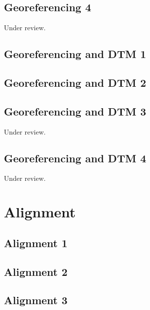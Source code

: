 \documentclass{scrartcl}
\begin{document}
\subsection{Georeferencing 4}
\label{sec:georeferencing_4}
Under review.%
\clearpage

\subsection{Georeferencing and DTM 1}
\label{sec:georef_tin_1}
\clearpage

\subsection{Georeferencing and DTM 2}
\label{sec:georef_tin_2}
\clearpage

\subsection{Georeferencing and DTM 3}
\label{sec:georef_tin_3}
Under review.%
\clearpage

\subsection{Georeferencing and DTM 4}
\label{sec:georef_tin_4}
Under review.%
\clearpage

\section{Alignment}

\subsection{Alignment 1}
\label{sec:align_1}
\clearpage

\subsection{Alignment 2}
\label{sec:align_2}
\clearpage

\subsection{Alignment 3}
\label{sec:align_3}
\clearpage
\end{document}
